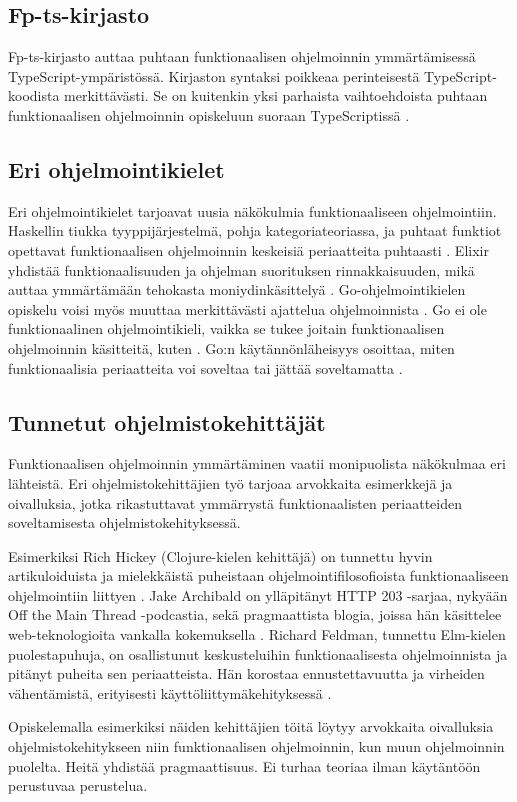 \subsection{Fp-ts-kirjasto}

Fp-ts-kirjasto auttaa puhtaan funktionaalisen ohjelmoinnin ymmärtämisessä TypeScript-ympäristössä. Kirjaston syntaksi poikkeaa perinteisestä TypeScript-koodista merkittävästi. Se on kuitenkin yksi parhaista vaihtoehdoista puhtaan funktionaalisen ohjelmoinnin opiskeluun suoraan TypeScriptissä \cite{holvikari2021category}.

\subsection{Eri ohjelmointikielet}
Eri ohjelmointikielet tarjoavat uusia näkökulmia funktionaaliseen ohjelmointiin. Haskellin tiukka tyyppijärjestelmä, pohja kategoriateoriassa, ja puhtaat funktiot opettavat funktionaalisen ohjelmoinnin keskeisiä periaatteita puhtaasti \cite{haskellallmonad,haskellcomposition,haskellmonadlaws}. Elixir yhdistää funktionaalisuuden ja ohjelman suorituksen rinnakkaisuuden, mikä auttaa ymmärtämään tehokasta moniydinkäsittelyä \cite{elixir}. Go-ohjelmointikielen opiskelu voisi myös muuttaa merkittävästi ajattelua ohjelmoinnista \cite{golang}. Go ei ole funktionaalinen ohjelmointikieli, vaikka se tukee joitain funktionaalisen ohjelmoinnin käsitteitä, kuten . Go:n käytännönläheisyys osoittaa, miten funktionaalisia periaatteita voi soveltaa tai jättää soveltamatta \cite{golang}.

\subsection{Tunnetut ohjelmistokehittäjät}

Funktionaalisen ohjelmoinnin ymmärtäminen vaatii monipuolista näkökulmaa eri lähteistä. Eri ohjelmistokehittäjien työ tarjoaa arvokkaita esimerkkejä ja oivalluksia, jotka rikastuttavat ymmärrystä funktionaalisten periaatteiden soveltamisesta ohjelmistokehityksessä.

Esimerkiksi Rich Hickey (Clojure-kielen kehittäjä) on tunnettu hyvin artikuloiduista ja mielekkäistä puheistaan ohjelmointifilosofioista funktionaaliseen ohjelmointiin liittyen \cite{hickey_maybe_not,hickey_persistent_2009}. Jake Archibald on ylläpitänyt HTTP 203 -sarjaa, nykyään Off the Main Thread -podcastia, sekä pragmaattista blogia, joissa hän käsittelee web-teknologioita vankalla kokemuksella \cite{against_self_closing_tags,is_reduce_bad}. Richard Feldman, tunnettu Elm-kielen puolestapuhuja, on osallistunut keskusteluihin funktionaalisesta ohjelmoinnista ja pitänyt puheita sen periaatteista. Hän korostaa ennustettavuutta ja virheiden vähentämistä, erityisesti käyttöliittymäkehityksessä \cite{feldman_fp_pragmatists,impossiblebetter,stackoverflow:why_monad}.

Opiskelemalla esimerkiksi näiden kehittäjien töitä löytyy arvokkaita oivalluksia ohjelmistokehitykseen niin funktionaalisen ohjelmoinnin, kun muun ohjelmoinnin puolelta. Heitä yhdistää pragmaattisuus. Ei turhaa teoriaa ilman käytäntöön perustuvaa perustelua.
